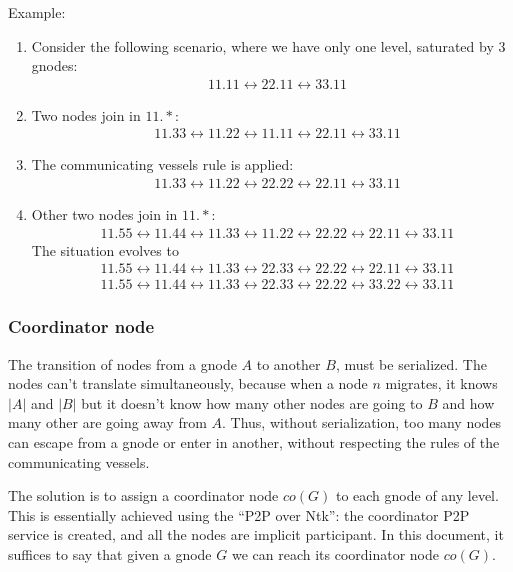 \documentclass[a4paper]{article}
\newcommand{\eal}[1]{{\begin{align*} #1 \end{align*}}}
\begin{document}
Example:
\begin{enumerate}
	\item Consider the following scenario, where we have only one level,
		saturated by 3 gnodes:
\eal{ &11.11 \leftrightarrow 22.11 \leftrightarrow 33.11}
\item Two nodes join in $11.*$:
\eal{ &11.33\leftrightarrow 11.22\leftrightarrow 11.11 \leftrightarrow 22.11 \leftrightarrow 33.11}
\item The communicating vessels rule is applied:
\eal{ &11.33\leftrightarrow 11.22\leftrightarrow 22.22 \leftrightarrow 22.11 \leftrightarrow 33.11}
\item Other two nodes join in $11.*$:
\eal{ &11.55\leftrightarrow 11.44\leftrightarrow 11.33\leftrightarrow 11.22\leftrightarrow 22.22 \leftrightarrow 22.11 \leftrightarrow 33.11}
	The situation evolves to
\eal{
&11.55\leftrightarrow 11.44\leftrightarrow 11.33\leftrightarrow
22.33\leftrightarrow 22.22 \leftrightarrow 22.11 \leftrightarrow 33.11\\ 
&11.55\leftrightarrow 11.44\leftrightarrow 11.33\leftrightarrow
22.33\leftrightarrow 22.22 \leftrightarrow 33.22 \leftrightarrow 33.11
}
\end{enumerate}

\subsubsection{Coordinator node}
The transition of nodes from a gnode $A$ to another $B$, must be serialized.
The nodes can't translate simultaneously, because when a node $n$ migrates, it knows
$|A|$ and $|B|$ but it doesn't know how many other nodes are going to $B$ and
how many other are going away from $A$. Thus, without serialization, too many
nodes can escape from a gnode or enter in another, without respecting the
rules of the communicating vessels.

The solution is to assign a coordinator node $co(G)$ to each gnode of any
level. This is essentially achieved using the ``P2P over Ntk''\cite{ntkp2p}:
the coordinator P2P service is created, and all the nodes are implicit
participant. In this document, it suffices to say that given a gnode $G$ we
can reach its coordinator node $co(G)$.
\end{document}
